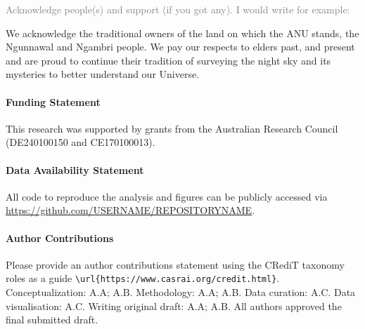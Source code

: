 \documentclass[
  journal=pasa,
  manuscript=Research-Article,
  year=2025,
  volume=X,
]{cup-journal}
\newcommand{\comment}[1]{\textcolor{gray}{#1}}
\begin{document}
\comment{Acknowledge people(s) and support (if you got any). I would write for example:}

We acknowledge the traditional owners of the land on which the ANU stands, the Ngunnawal and Ngambri people. We pay our respects to elders past, and present and are proud to continue their tradition of surveying the night sky and its mysteries to better understand our Universe.

\paragraph{Funding Statement}
This research was supported by grants from the Australian Research Council (DE240100150 and CE170100013).

\paragraph{Data Availability Statement}

All code to reproduce the analysis and figures can be publicly accessed via \url{https://github.com/USERNAME/REPOSITORYNAME}.

\paragraph{Author Contributions}
Please provide an author contributions statement using the CRediT taxonomy roles as a guide {\verb+\url{https://www.casrai.org/credit.html}+}. Conceptualization: A.A; A.B. Methodology: A.A; A.B. Data curation: A.C. Data visualisation: A.C. Writing original draft: A.A; A.B. All authors approved the final submitted draft.





\end{document}
